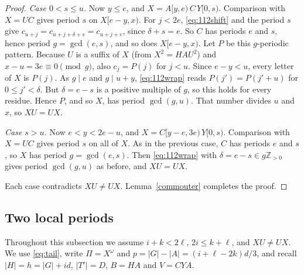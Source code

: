 \begin{proof}
\emph{Case \(0<s\le u\).} Now \(y\le e\), and \(X=A[y,e)\,C\,Y[0,s)\). Comparison with \(X=UC\) gives period \(s\) on \(X[e-y,x)\). For \(j<2e\), \eqref{eq:112shift} and the period \(s\) give \(c_{u+j}=c_{u+j+\delta+s}=c_{u+j+e}\), since \(\delta+s=e\). So \(C\) has periods \(e\) and \(s\), hence period \(g=\gcd(e,s)\), and so does \(X[e-y,x)\). Let \(P\) be this \(g\)-periodic pattern. Because \(U\) is a suffix of \(X\) (from \(X^2=HAU^2\)) and \(x-u=3e\equiv0\pmod g\), also \(c_j=P(j)\) for \(j<u\). Since \(e-y<u\), every letter of \(X\) is \(P(j)\). As \(g\mid e\) and \(g\mid u+y\), \eqref{eq:112wrap} reads \(P(j')=P(j'+u)\) for \(0\le j'<\delta\). But \(\delta=e-s\) is a positive multiple of \(g\), so this holds for every residue. Hence \(P\), and so \(X\), has period \(\gcd(g,u)\). That number divides \(u\) and \(x\), so \(XU=UX\).

\emph{Case \(s>u\).} Now \(e<y<2e-u\), and \(X=C[y-e,3e)\,Y[0,s)\). Comparison with \(X=UC\) gives period \(s\) on all of \(X\). As in the previous case, \(C\) has periods \(e\) and \(s\), so \(X\) has period \(g=\gcd(e,s)\). Then \eqref{eq:112wrap} with \(\delta=e-s\in g\mathbb{Z}_{>0}\) gives period \(\gcd(g,u)\) as before, and \(XU=UX\).

Each case contradicts \(XU\ne UX\). Lemma~\ref{commouter} completes the proof.
\end{proof}

\subsection{Two local periods}
Throughout this subsection we assume \(i+k<2\ell\), \(2i\le k+\ell\), and \(XU\ne UX\). We use \eqref{eq:tail}, write \(\Pi=X^\omega\) and \(p=|G|-|A|=(i+\ell-2k)d/3\), and recall \(|H|=h=|G|+id\), \(|T'|=D\), \(B=HA\) and \(V=CYA\).

